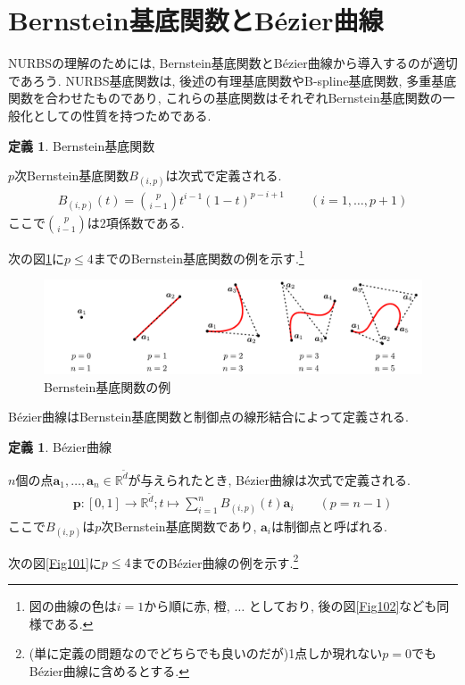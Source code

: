 \documentclass{jsarticle}
\newcommand\setR{\mathbb{R}}
\newcommand\nCr[2]{\binom{#1}{#2}}
\theoremstyle{definition}%
\newtheorem{defn}[thm]{定義}
\begin{document}
\section{Bernstein基底関数とB\'{e}zier曲線}
NURBSの理解のためには, Bernstein基底関数とB\'{e}zier曲線から導入するのが適切であろう.
NURBS基底関数は, 後述の有理基底関数やB-spline基底関数, 多重基底関数を合わせたものであり, これらの基底関数はそれぞれBernstein基底関数の一般化としての性質を持つためである.
\begin{screen}
	\begin{defn}
        \label{Def101}
		Bernstein基底関数

		$p$次Bernstein基底関数$B_{(i,p)}$は次式で定義される.
		\begin{align}
			\label{Eqn101}
			B_{(i,p)}(t)=\nCr{p}{i-1}t^{i-1}(1-t)^{p-i+1} \qquad (i=1,\dots,p+1)
		\end{align}
		ここで$\nCr{p}{i-1}$は$2$項係数である.
	\end{defn}
\end{screen}
次の図\ref{Fig104}に$p\le 4$までのBernstein基底関数の例を示す.\footnote{図の曲線の色は$i=1$から順に赤, 橙, $\dots$ としており, 後の図\ref{Fig102}なども同様である.}
\addtocounter{footnote}{-1}
\begin{figure}[H]
	\centering
    \includegraphics[page=10,clip,width=160mm]{fig.pdf}
	\caption{Bernstein基底関数の例\protect\footnotemark}
	\label{Fig104}
\end{figure}
B\'{e}zier曲線はBernstein基底関数と制御点の線形結合によって定義される.
\begin{screen}
	\begin{defn}
		B\'ezier曲線

		$n$個の点$\bm{a}_1, \dots, \bm{a}_n\in\mathbb{R}^{\tilde{d}}$が与えられたとき, B\'ezier曲線は次式で定義される.
		\begin{align}
			\label{Eqn102}
			\bm{p}:[0,1]\to \setR^{\tilde{d}};t\mapsto \sum_{i=1}^nB_{(i,p)}(t)\bm{a}_i \qquad (p=n-1)
		\end{align}
        ここで$B_{(i,p)}$は$p$次Bernstein基底関数であり, $\bm{a}_i$は制御点と呼ばれる.
	\end{defn}
\end{screen}
次の図\ref{Fig101}に$p\le 4$までのB\'ezier曲線の例を示す.\footnote{(単に定義の問題なのでどちらでも良いのだが)1点しか現れない$p=0$でもB\'{e}zier曲線に含めるとする.}
\newpage
\end{document}
